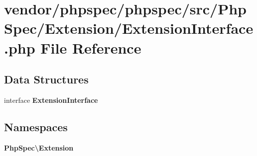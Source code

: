 \section{vendor/phpspec/phpspec/src/\+Php\+Spec/\+Extension/\+Extension\+Interface.php File Reference}
\label{_extension_interface_8php}
\subsection*{Data Structures}
\begin{DoxyCompactItemize}
\item 
interface {\bf Extension\+Interface}
\end{DoxyCompactItemize}
\subsection*{Namespaces}
\begin{DoxyCompactItemize}
\item 
 {\bf Php\+Spec\textbackslash{}\+Extension}
\end{DoxyCompactItemize}
